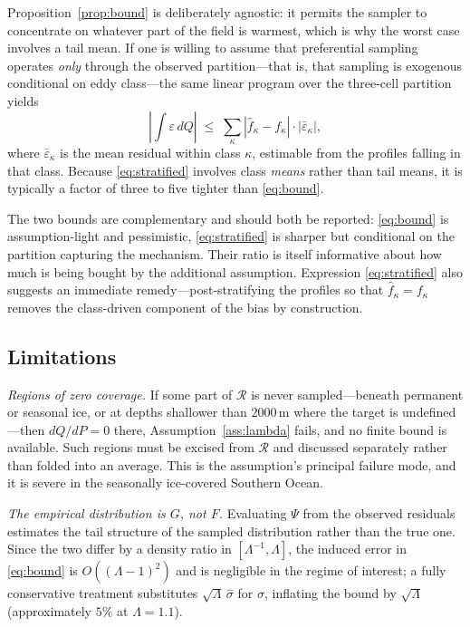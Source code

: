 Proposition~\ref{prop:bound} is deliberately agnostic: it permits the sampler to concentrate
on whatever part of the field is warmest, which is why the worst case involves a tail mean. If
one is willing to assume that preferential sampling operates \emph{only} through the observed
partition---that is, that sampling is exogenous conditional on eddy class---the same linear
program over the three-cell partition yields
\begin{equation}
  \label{eq:stratified}
  \left| \int \varepsilon \, dQ \right| \;\le\; \sum_{\kappa}
  \left| \hat{f}_\kappa - f_\kappa \right| \cdot \left| \bar\varepsilon_\kappa \right| ,
\end{equation}
where $\bar\varepsilon_\kappa$ is the mean residual within class $\kappa$, estimable from the
profiles falling in that class. Because \eqref{eq:stratified} involves class \emph{means}
rather than tail means, it is typically a factor of three to five tighter than
\eqref{eq:bound}.

The two bounds are complementary and should both be reported: \eqref{eq:bound} is
assumption-light and pessimistic, \eqref{eq:stratified} is sharper but conditional on the
partition capturing the mechanism. Their ratio is itself informative about how much is being
bought by the additional assumption. Expression \eqref{eq:stratified} also suggests an
immediate remedy---post-stratifying the profiles so that $\hat f_\kappa = f_\kappa$ removes
the class-driven component of the bias by construction.

\subsection{Limitations}
\label{sec:limitations}

\emph{Regions of zero coverage.} If some part of $\mathcal{R}$ is never sampled---beneath
permanent or seasonal ice, or at depths shallower than $2000$\,m where the target is
undefined---then $dQ/dP = 0$ there, Assumption~\ref{ass:lambda} fails, and no finite bound is
available. Such regions must be excised from $\mathcal{R}$ and discussed separately rather
than folded into an average. This is the assumption's principal failure mode, and it is severe
in the seasonally ice-covered Southern Ocean.

\emph{The empirical distribution is $G$, not $F$.} Evaluating $\Psi$ from the observed
residuals estimates the tail structure of the sampled distribution rather than the true one.
Since the two differ by a density ratio in $[\Lambda^{-1},\Lambda]$, the induced error in
\eqref{eq:bound} is $O((\Lambda-1)^2)$ and is negligible in the regime of interest; a fully
conservative treatment substitutes $\sqrt{\Lambda}\,\hat\sigma$ for $\sigma$, inflating the
bound by $\sqrt{\Lambda}$ (approximately $5\%$ at $\Lambda = 1.1$).

